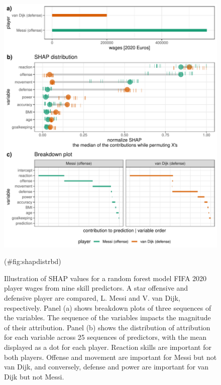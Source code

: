 \documentclass[
]{jss}
\begin{document}
\begin{CodeChunk}
\begin{figure}

{\centering \includegraphics[width=0.85\linewidth]{./figures/shap_distr_bd} 

}

\caption[Illustration of SHAP values for a random forest model FIFA 2020 player wages from nine skill predictors]{Illustration of SHAP values for a random forest model FIFA 2020 player wages from nine skill predictors. A star offensive and defensive player are compared, L. Messi and V. van Dijk, respectively. Panel (a) shows breakdown plots of three sequences of the variables. The sequence of the variables impacts the magnitude of their attribution. Panel (b) shows the distribution of attribution for each variable across 25 sequences of predictors, with the mean displayed as a dot for each player. Reaction skills are important for both players. Offense and movement are important for Messi but not van Dijk, and conversely, defense and power are important for van Dijk but not Messi.}(\#fig:shapdistrbd)
\end{figure}
\end{CodeChunk}
\end{document}
